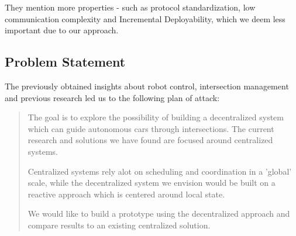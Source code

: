 They mention more properties - such as protocol standardization, low communication complexity and Incremental Deployability, which we deem less important due to our approach.

\subsection{Problem Statement}
The previously obtained insights about robot control, intersection management and previous research led us to the following plan of attack:

\begin{quotation}
The goal is to explore the possibility of building a decentralized system which can guide autonomous cars through intersections. 
The current research and solutions we have found are focused around centralized systems. 

Centralized systems rely alot on scheduling and coordination in a 'global' scale, 
while the decentralized system we envision would be built on a reactive approach which is centered around local state. 

We would like to build a prototype using the decentralized approach and compare results to an existing centralized solution.
\end{quotation}